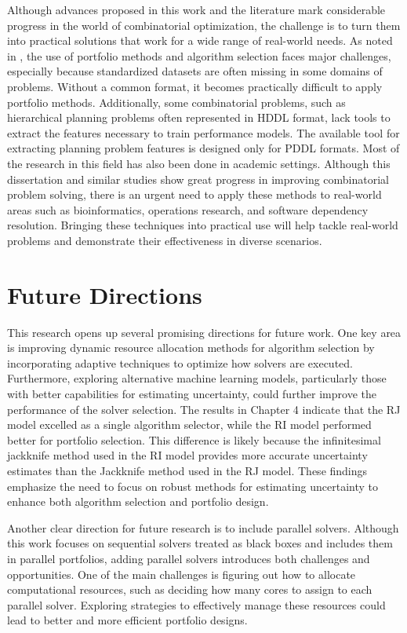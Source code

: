 Although advances proposed in this work and the literature mark considerable progress in the world of combinatorial optimization, the challenge is to turn them into practical solutions that work for a wide range of real-world needs. As noted in \cite{10.1007/978-3-319-27436-2_21}, the use of portfolio methods and algorithm selection faces major challenges, especially because standardized datasets are often missing in some domains of problems. Without a common format, it becomes practically difficult to apply portfolio methods. Additionally, some combinatorial problems, such as hierarchical planning problems often represented in HDDL format, lack tools to extract the features necessary to train performance models. The available tool for extracting planning problem features is designed only for PDDL formats. Most of the research in this field has also been done in academic settings. Although this dissertation and similar studies show great progress in improving combinatorial problem solving, there is an urgent need to apply these methods to real-world areas such as bioinformatics, operations research, and software dependency resolution. Bringing these techniques into practical use will help tackle real-world problems and demonstrate their effectiveness in diverse scenarios.

\section{Future Directions}

This research opens up several promising directions for future work. One key area is improving dynamic resource allocation methods for algorithm selection by incorporating adaptive techniques to optimize how solvers are executed. Furthermore, exploring alternative machine learning models, particularly those with better capabilities for estimating uncertainty, could further improve the performance of the solver selection. The results in Chapter 4 indicate that the RJ model excelled as a single algorithm selector, while the RI model performed better for portfolio selection. This difference is likely because the infinitesimal jackknife method used in the RI model provides more accurate uncertainty estimates than the Jackknife method used in the RJ model. These findings emphasize the need to focus on robust methods for estimating uncertainty to enhance both algorithm selection and portfolio design.

Another clear direction for future research is to include parallel solvers. Although this work focuses on sequential solvers treated as black boxes and includes them in parallel portfolios, adding parallel solvers introduces both challenges and opportunities. One of the main challenges is figuring out how to allocate computational resources, such as deciding how many cores to assign to each parallel solver. Exploring strategies to effectively manage these resources could lead to better and more efficient portfolio designs.

